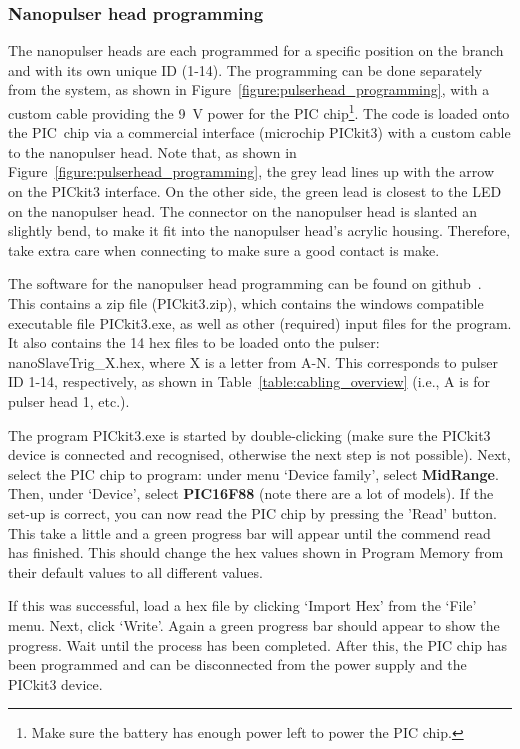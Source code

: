 %
%

\subsubsection*{Nanopulser head programming}

The nanopulser heads are each programmed for a specific position on the branch and with its own unique ID (1-14). 
The programming can be done separately from the system, as shown in Figure~\ref{figure:pulserhead_programming}, with a custom cable providing the 9~V power for the PIC chip\footnote{Make sure the battery has enough power left to power the PIC chip.}. The code is loaded onto the PIC~chip via a commercial interface (microchip PICkit3) with a custom cable to the nanopulser head. Note that, as shown in Figure~\ref{figure:pulserhead_programming}, the grey lead lines up with the arrow on the PICkit3 interface. On the other side, the green lead is closest to the LED on the nanopulser head. The connector on the nanopulser head is slanted an slightly bend, to make it fit into the nanopulser head's acrylic housing. Therefore, take extra care when connecting to make sure a good contact is make.

The software for the nanopulser head programming can be found on github~\cite{GITHUB_PIC}. This contains a zip file (PICkit3.zip), which contains the windows compatible executable file PICkit3.exe, as well as other (required) input files for the program. It also contains the 14 hex files to be loaded onto the pulser: nanoSlaveTrig\_X.hex, where X is a letter from A-N. This corresponds to pulser ID 1-14, respectively, as shown in Table~\ref{table:cabling_overview} (i.e., A is for pulser head 1, etc.).

The program PICkit3.exe is started by double-clicking (make sure the PICkit3 device is connected and recognised, otherwise the next step is not possible). Next, select the PIC chip to program: under menu `Device family', select {\bf MidRange}. Then, under `Device', select {\bf PIC16F88} (note there are a lot of models). If the set-up is correct, you can now read the PIC chip by pressing the 'Read' button. This take a little and a green progress bar will appear until the commend read has finished. This should change the hex values shown in Program Memory from their default values to all different values. 

If this was successful, load a hex file by clicking `Import Hex' from the `File' menu. Next, click `Write'. Again a green progress bar should appear to show the progress. Wait until the process has been completed. After this, the PIC chip has been programmed and can be disconnected from the power supply and the PICkit3 device.


